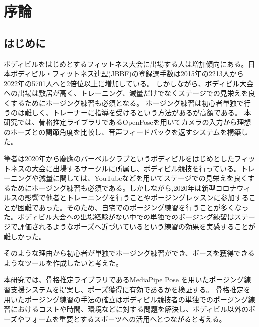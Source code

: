 \chapter{序論}
\label{introduction}

\section{はじめに}
\label{introduction:background}
ボディビルをはじめとするフィットネス大会に出場する人は増加傾向にある。日本ボディビル・フィットネス連盟(JBBF)の登録選手数は2015年の2213人から2022年の5701人へと2倍位以上に増加している\cite{jbbf}。
しかしながら、ボディビル大会への出場は敷居が高く、トレーニング、減量だけでなくステージでの見栄えを良くするためにポージング練習も必須となる。
ポージング練習は初心者単独で行うのは難しく、トレーナーに指導を受けるという方法があるが高額である。
本研究では、骨格推定ライブラリであるOpenPoseを用いてカメラの入力から理想のポーズとの関節角度を比較し、音声フィードバックを返すシステムを構築した。

筆者は2020年から慶應のバーベルクラブというボディビルをはじめとしたフィットネスの大会に出場するサークルに所属し、ボディビル競技を行っている。トレーニングや減量に関しては、YouTubeなどを用いてステージでの見栄えを良くするためにポージング練習も必須である。しかしながら,2020年は新型コロナウィルスの影響で他者とトレーニングを行うことやポージングレッスンに参加することが困難であった。そのため、自宅でのポージング練習を行うことが多くなった。ボディビル大会への出場経験がない中での単独でのポージング練習はステージで評価されるようなポーズへ近づいているという練習の効果を実感することが難しかった。

そのような理由から初心者が単独でポージング練習ができ、ポーズを獲得できるようなツールを作成したいと考えた。


本研究では、骨格推定ライブラリであるMediaPipe Pose \cite{mediapipe_pose_landmarker}を用いたポージング練習支援システムを提案し、ポーズ獲得に有効であるかを検証する。
骨格推定を用いたポージング練習の手法の確立はボディビル競技者の単独でのポージング練習におけるコストや時間、環境などに対する問題を解決し、ボディビル以外のポーズやフォームを重要とするスポーツへの活用へとつながると考える。


